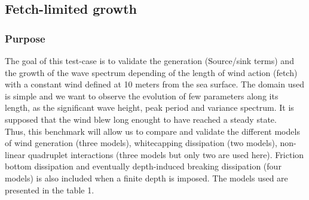 \subsection{Fetch-limited growth}
%

%    
\subsubsection{Purpose}
The goal of this test-case is to validate the generation (Source/sink terms)  and the growth of the wave spectrum depending of the length of wind action (fetch) with a constant wind defined at 10 meters from the sea surface. The domain used is simple and we want to observe the evolution of few parameters along its length, as the significant wave height, peak period and variance spectrum. 
It is supposed that the wind blew long enought to have reached a steady state.\\
Thus, this benchmark will allow us to compare and validate the different models of wind generation (three models), whitecapping dissipation (two models), non-linear quadruplet interactions (three models but only two are used here). Friction bottom dissipation and eventually depth-induced breaking dissipation (four models) is also included when a finite depth is imposed. The models used are presented in the table 1.\\ \quad \\
\vspace{1cm}
\hspace{-2cm}

